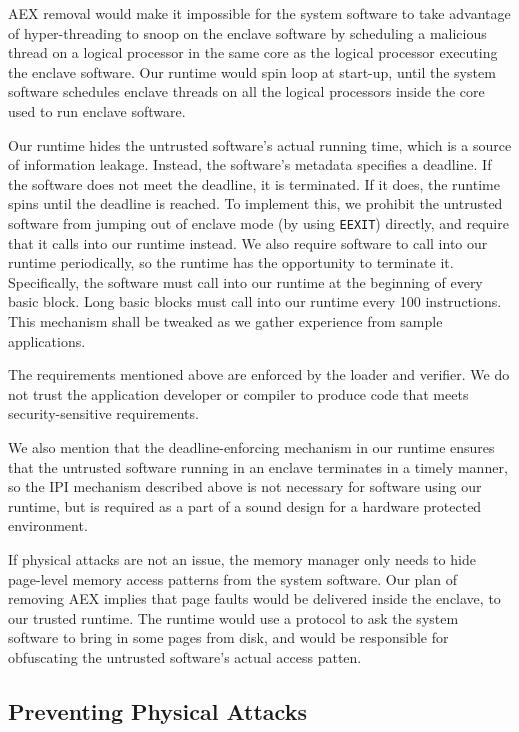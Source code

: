AEX removal would make it impossible for the system software to take advantage
of hyper-threading to snoop on the enclave software by scheduling a malicious
thread on a logical processor in the same core as the logical processor
executing the enclave software. Our runtime would spin loop at start-up, until
the system software schedules enclave threads on all the logical processors
inside the core used to run enclave software.

Our runtime hides the untrusted software's actual running time, which is a
source of information leakage. Instead, the software's metadata specifies a
deadline. If the software does not meet the deadline, it is terminated. If it
does, the runtime spins until the deadline is reached. To implement this, we
prohibit the untrusted software from jumping out of enclave mode (by using
\texttt{EEXIT}) directly, and require that it calls into our runtime instead.
We also require software to call into our runtime periodically, so the runtime
has the opportunity to terminate it. Specifically, the software must call into
our runtime at the beginning of every basic block. Long basic blocks must call
into our runtime every 100 instructions. This mechanism shall be tweaked as we
gather experience from sample applications.

The requirements mentioned above are enforced by the loader and verifier. We do
not trust the application developer or compiler to produce code that meets
security-sensitive requirements.

We also mention that the deadline-enforcing mechanism in our runtime ensures
that the untrusted software running in an enclave terminates in a timely
manner, so the IPI mechanism described above is not necessary for software
using our runtime, but is required as a part of a sound design for a hardware
protected environment.

If physical attacks are not an issue, the memory manager only needs to hide
page-level memory access patterns from the system software. Our plan of
removing AEX implies that page faults would be delivered inside the enclave, to
our trusted runtime. The runtime would use a protocol to ask the system
software to bring in some pages from disk, and would be responsible for
obfuscating the untrusted software's actual access patten.


\subsection{Preventing Physical Attacks}

